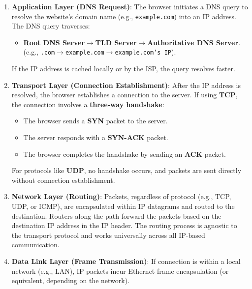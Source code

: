 \newpage



\begin{theo}

    \begin{enumerate}
        \item \textbf{Application Layer (DNS Request)}:
        The browser initiates a DNS query to resolve the website's domain name (e.g., \texttt{example.com}) into an IP address. The DNS query traverses:
        \begin{itemize}
            \item \textbf{Root DNS Server}$\rightarrow$\textbf{TLD Server}$\rightarrow$\textbf{Authoritative DNS Server}.\\
            (e.g., \texttt{.com}$\rightarrow$\texttt{example.com}$\rightarrow$\texttt{example.com's IP}).
        \end{itemize}
        If the IP address is cached locally or by the ISP, the query resolves faster.
    
        \item \textbf{Transport Layer (Connection Establishment)}:
        After the IP address is resolved, the browser establishes a connection to the server. If using \textbf{TCP}, the connection involves a \textbf{three-way handshake}:
        \begin{itemize}
            \item The browser sends a \textbf{SYN} packet to the server.
            \item The server responds with a \textbf{SYN-ACK} packet.
            \item The browser completes the handshake by sending an \textbf{ACK} packet.
        \end{itemize}
        For protocols like \textbf{UDP}, no handshake occurs, and packets are sent directly without connection establishment.
    
        \item \textbf{Network Layer (Routing)}:
        Packets, regardless of protocol (e.g., TCP, UDP, or ICMP), are encapsulated within IP datagrams and routed to the destination. Routers along the path forward the packets based on the destination IP address in the IP header. The routing process is agnostic to the transport protocol and works universally across all IP-based communication.
    
        \item \textbf{Data Link Layer (Frame Transmission)}:
        If connection is within a local network (e.g., LAN), IP packets incur Ethernet frame encapsulation (or equivalent, depending on the network).
    

\end{enumerate}
\end{theo}
